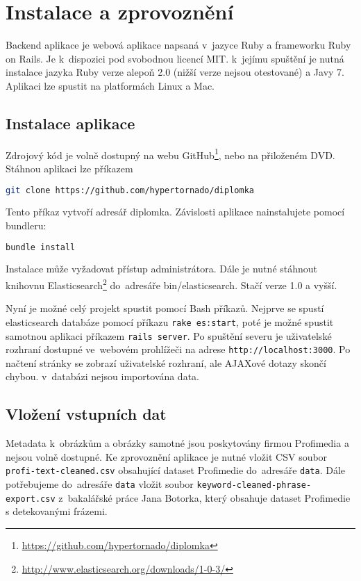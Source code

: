 \chapter{Instalace a zprovoznění}
\label{chap:implementace}

Backend aplikace je webová aplikace napsaná v~jazyce Ruby a frameworku Ruby on Rails. Je k~dispozici pod svobodnou licencí MIT. k~jejímu spuštění je nutná instalace jazyka Ruby verze alepoň 2.0 (nižší verze nejsou otestované) a Javy 7. Aplikaci lze spustit na platformách Linux a Mac.

\section{Instalace aplikace}

Zdrojový kód je volně dostupný na webu GitHub\footnote{\url{https://github.com/hypertornado/diplomka}}, nebo na přiloženém DVD. Stáhnou aplikaci lze příkazem

\begin{lstlisting}[language=bash]
git clone https://github.com/hypertornado/diplomka
\end{lstlisting}

Tento příkaz vytvoří adresář diplomka. Závislosti aplikace nainstalujete pomocí bundleru:

\begin{lstlisting}[language=bash]
bundle install
\end{lstlisting}

Instalace může vyžadovat přístup administrátora. Dále je nutné stáhnout knihovnu Elasticsearch\footnote{\url{http://www.elasticsearch.org/downloads/1-0-3/}} do~adresáře bin/elasticsearch. Stačí verze 1.0 a vyšší.

Nyní je možné celý projekt spustit pomocí Bash příkazů. Nejprve se spustí elasticsearch databáze pomocí příkazu \lstinline{rake es:start}, poté je možné spustit samotnou aplikaci příkazem \lstinline{rails server}. Po spuštění severu je uživatelské rozhraní dostupné ve~webovém prohlížeči na adrese \lstinline{http://localhost:3000}. Po načtení stránky se zobrazí uživatelské rozhraní, ale AJAXové dotazy skončí chybou. v~databázi nejsou importována data.

\section{Vložení vstupních dat}

Metadata k~obrázkům a obrázky samotné jsou poskytovány firmou Profimedia a nejsou volně dostupné. Ke zprovoznění aplikace je nutné vložit CSV soubor \lstinline{profi-text-cleaned.csv} obsahující dataset Profimedie do~adresáře \lstinline{data}. Dále potřebujeme do~adresáře \lstinline{data} vložit soubor \lstinline{keyword-cleaned-phrase-export.csv} z~bakalářské práce Jana Botorka, který obsahuje dataset Profimedie s detekovanými frázemi.


